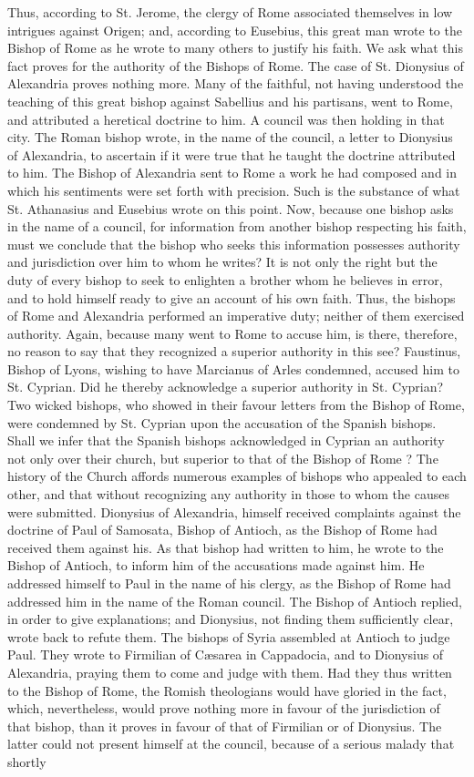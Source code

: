 Thus, according to St. Jerome, the clergy of Rome associated themselves in low intrigues against Origen; and, according to Eusebius, this great man wrote to the Bishop of Rome as he wrote to many others to justify his faith. We ask what this fact proves for the authority of the Bishops of Rome. The case of St. Dionysius of Alexandria proves nothing more. Many of the faithful, not having understood the teaching of this great bishop against Sabellius and his partisans, went to Rome, and attributed a heretical doctrine to him. A council was then holding in that city. The Roman bishop wrote, in the name of the council, a letter to Dionysius of Alexandria, to ascertain if it were true that he taught the doctrine attributed to him. The Bishop of Alexandria sent to Rome a work he had composed and in which his sentiments were set forth with precision. Such is the substance of what St. Athanasius and Eusebius wrote on this point. Now, because one bishop asks in the name of a council, for information from another bishop respecting his faith, must we conclude that the bishop who seeks this information possesses authority and jurisdiction over him to whom he writes? It is not only the right but the duty of every bishop to seek to enlighten a brother whom he believes in error, and to hold himself ready to give an account of his own faith. Thus, the bishops of Rome and Alexandria performed an imperative duty; neither of them exercised authority. Again, because many went to Rome to accuse him, is there, therefore, no reason to say that they recognized a superior authority in this see? Faustinus, Bishop of Lyons, wishing to have Marcianus of Arles condemned, accused him to St. Cyprian. Did he thereby acknowledge a superior authority in St. Cyprian? Two wicked bishops, who showed in their favour letters from the Bishop of Rome, were condemned by St. Cyprian upon the accusation of the Spanish bishops. Shall we infer that the Spanish bishops acknowledged in Cyprian an authority not only over their church, but superior to that of the Bishop of Rome ? The history of the Church affords numerous examples of bishops who appealed to each other, and that without recognizing any authority in those to whom the causes were submitted. Dionysius of Alexandria, himself received complaints against the doctrine of Paul of Samosata, Bishop of Antioch, as the Bishop of Rome had received them against his. As that bishop had written to him, he wrote to the Bishop of Antioch, to inform him of the accusations made against him. He addressed himself to Paul in the name of his clergy, as the Bishop of Rome had addressed him in the name of the Roman council. The Bishop of Antioch replied, in order to give explanations; and Dionysius, not finding them sufficiently clear, wrote back to refute them. The bishops of Syria assembled at Antioch to judge Paul. They wrote to Firmilian of Cæsarea in Cappadocia, and to Dionysius of Alexandria, praying them to come and judge with them. Had they thus written to the Bishop of Rome, the Romish theologians would have gloried in the fact, which, nevertheless, would prove nothing more in favour of the jurisdiction of that bishop, than it proves in favour of that of Firmilian or of Dionysius. The latter could not present himself at the council, because of a serious malady that shortly 
